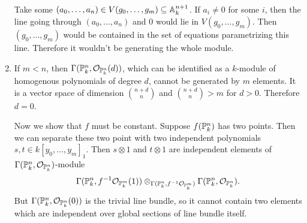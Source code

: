 \begin{exercise}{3}
\begin{enumerate}
{                Take some $(a_0, \dots, a_n) \in V(g_0, \dots, g_m) \subseteq
                \mathbb{A}^{n+1}_k$. If $a_i \not= 0$ for some $i$, then the line
                going through $(a_0, \dots, a_n)$ and $0$ would lie in $V(g_0,
                \dots, g_m)$. Then $(g_0, \dots, g_m)$ would be contained in the
                set of equations parametrizing this line. Therefore it wouldn't
                be generating the whole module.
            }
        \item{
                If $m < n$, then $\Gamma(\mathbb{P}^n_k,
                \mathcal{O}_{\mathbb{P}^n_k}(d))$, which can be identified as a
                $k$-module of homogenous polynomials of degree $d$, cannot be
                generated by $m$ elements. It is a vector space of dimension
                $\binom{n + d}{n}$ and $\binom{n + d}{n} > m$ for $d > 0$.
                Therefore $d = 0$.

                Now we show that $f$ must be constant. Suppose $f(\mathbb{P}^n_k)$
                has two points. Then we can separate these two point with two
                independent polynomials $s, t \in k[y_0, \dots, y_m]_1$. Then $s
                \otimes 1$ and $t \otimes 1$ are independent elements of
                $\Gamma(\mathbb{P}^n_k, \mathcal{O}_{\mathbb{P}^n_k})$-module
                \begin{equation*}
                    \Gamma(\mathbb{P}^n_k, f^{-1} \mathcal{O}_{\mathbb{P}^m_k}(1))
                    \otimes_{\Gamma(\mathbb{P}^n_k, f^{-1} \mathcal{O}_{\mathbb{P}^m_k})}
                    \Gamma(\mathbb{P}^n_k, \mathcal{O}_{\mathbb{P}^n_k}).
                \end{equation*}
                But $\Gamma(\mathbb{P}^n_k, \mathcal{O}_{\mathbb{P}^n_k} (0))$ is the
                trivial line bundle, so it cannot contain two elements which are
                independent over global sections of line bundle itself.
            }
    \end{enumerate}
\end{exercise}

